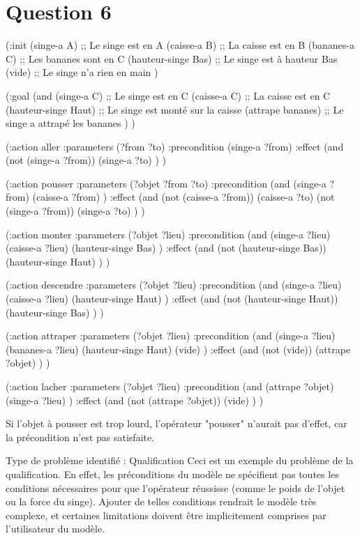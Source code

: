 \documentclass[../CSC_5RO16_TA_TP5.tex]{subfiles}
\begin{document}
\section{Question 6}
% 


(:init 
    (singe-a A)       ;; Le singe est en A
    (caisse-a B)      ;; La caisse est en B
    (bananes-a C)     ;; Les bananes sont en C
    (hauteur-singe Bas) ;; Le singe est à hauteur Bas
    (vide)            ;; Le singe n’a rien en main
)

(:goal 
    (and 
        (singe-a C)         ;; Le singe est en C
        (caisse-a C)        ;; La caisse est en C
        (hauteur-singe Haut) ;; Le singe est monté sur la caisse
        (attrape bananes)   ;; Le singe a attrapé les bananes
    )
)


(:action aller
  :parameters (?from ?to)
  :precondition (singe-a ?from)
  :effect (and 
            (not (singe-a ?from))
            (singe-a ?to)
          )
)

(:action pousser
  :parameters (?objet ?from ?to)
  :precondition (and 
                  (singe-a ?from) 
                  (caisse-a ?from)
                )
  :effect (and 
            (not (caisse-a ?from))
            (caisse-a ?to)
            (not (singe-a ?from))
            (singe-a ?to)
          )
)


(:action monter
  :parameters (?objet ?lieu)
  :precondition (and 
                  (singe-a ?lieu) 
                  (caisse-a ?lieu) 
                  (hauteur-singe Bas)
                )
  :effect (and 
            (not (hauteur-singe Bas))
            (hauteur-singe Haut)
          )
)


(:action descendre
  :parameters (?objet ?lieu)
  :precondition (and 
                  (singe-a ?lieu) 
                  (caisse-a ?lieu) 
                  (hauteur-singe Haut)
                )
  :effect (and 
            (not (hauteur-singe Haut))
            (hauteur-singe Bas)
          )
)


(:action attraper
  :parameters (?objet ?lieu)
  :precondition (and 
                  (singe-a ?lieu) 
                  (bananes-a ?lieu) 
                  (hauteur-singe Haut) 
                  (vide)
                )
  :effect (and 
            (not (vide))
            (attrape ?objet)
          )
)


(:action lacher
  :parameters (?objet ?lieu)
  :precondition (and 
                  (attrape ?objet) 
                  (singe-a ?lieu)
                )
  :effect (and 
            (not (attrape ?objet))
            (vide)
          )
)


Si l'objet à pousser est trop lourd, l'opérateur "pousser" n'aurait pas d'effet, car la précondition n'est pas satisfaite.

Type de problème identifié : Qualification
Ceci est un exemple du problème de la qualification. En effet, les préconditions du modèle ne spécifient pas toutes les conditions nécessaires pour que l'opérateur réussisse (comme le poids de l'objet ou la force du singe). Ajouter de telles conditions rendrait le modèle très complexe, et certaines limitations doivent être implicitement comprises par l'utilisateur du modèle.
\end{document}
